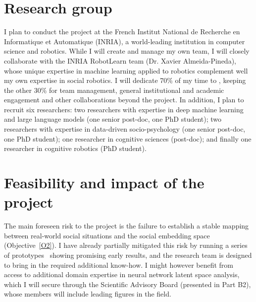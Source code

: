 %



\section{Research group}

I plan to conduct the \project project at the French Institut National de
Recherche en Informatique et Automatique (INRIA), a world-leading institution in
computer science and robotics. While I will create and manage my own team, I
will closely collaborate with the INRIA RobotLearn team (Dr. Xavier
Almeida-Pineda), whose unique expertise in machine learning applied to robotics
complement well my own expertise in social robotics.  I will dedicate 70\% of my
time to \project, keeping the other 30\% for team management, general
institutional and academic engagement and other collaborations beyond the
\project project. In addition, I plan to recruit six researchers: two
researchers with expertise in deep machine learning and large language models
(one senior post-doc, one PhD student); two researchers with expertise in
data-driven socio-psychology (one senior post-doc, one PhD student); one
researcher in cognitive sciences (post-doc); and finally one researcher in
cognitive robotics (PhD student).


\section{Feasibility and impact of the \project project}

The main foreseen risk to the \project project is the failure to establish a
stable mapping between real-world social situations and the social embedding
space (Objective~\ref{O2}). I have already partially mitigated this risk by
running a series of prototypes~\cite{lemaignan2024social} showing promising
early results, and the \project research team is designed to bring in the
required additional know-how. I might however benefit from access to additional
domain expertise in neural network latent space analysis, which I will secure
through the \project Scientific Advisory Board (presented in Part B2), whose members will include leading figures in the field.


